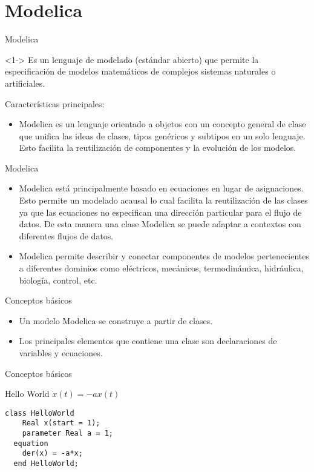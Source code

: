 \section{Modelica}

\begin{frame}{Modelica}
    \begin{block}<1->{}
        Es un lenguaje de modelado (estándar abierto) que permite la especificación de modelos matemáticos de complejos sistemas naturales o artificiales.
    \end{block}
    Características principales:
    \begin{itemize}
        \item<2-> Modelica es un lenguaje orientado a objetos con un concepto general de clase que unifica las ideas de clases, tipos genéricos y subtipos en un solo lenguaje. Esto facilita la reutilización de componentes y la evolución de los modelos. 
    \end{itemize}
\end{frame}

\begin{frame}{Modelica}
    \begin{itemize}
        \item<1-> Modelica está principalmente basado en ecuaciones en lugar de asignaciones. Esto permite un modelado acausal lo cual facilita la reutilización de las clases ya que las ecuaciones no especifican una dirección particular para el flujo de datos. De esta manera una clase Modelica se puede adaptar a contextos con diferentes flujos de datos.
        \item<2-> Modelica permite describir y conectar componentes de modelos pertenecientes a diferentes dominios como eléctricos, mecánicos, termodinámica, hidráulica, biología, control, etc. 
    \end{itemize}
\end{frame}

\begin{frame}{Conceptos básicos}
    \begin{itemize}
        \item<1-> Un modelo Modelica se construye a partir de clases.
        \item<2-> Los principales elementos que contiene una clase  son declaraciones de variables y ecuaciones.
    \end{itemize}
\end{frame}

\begin{frame}[fragile]{Conceptos básicos}
    \begin{block}{Hello World}
        $\dot{x}(t)=-a x(t)$
    \end{block}
    \pause
    \begin{lstlisting}[language=Modelica]
  class HelloWorld
    Real x(start = 1);
    parameter Real a = 1;
  equation
    der(x) = -a*x;
  end HelloWorld;
    \end{lstlisting}  
\end{frame}